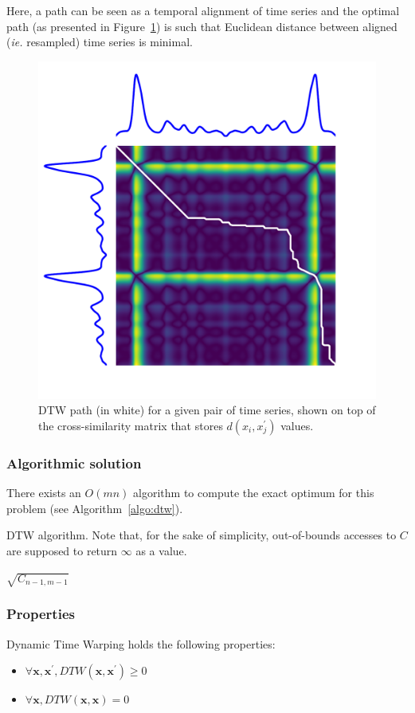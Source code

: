 Here, a path can be seen as a temporal alignment of time series and the optimal
path (as presented in Figure~\ref{fig:dtw}) is such that
Euclidean distance between aligned (\emph{ie.} resampled) time series is
minimal.

\begin{figure}[t]
\centering
\includegraphics[width=.4\textwidth]{fig/dtw}
\caption{DTW path (in white) for a given pair of time
series, shown on top of the cross-similarity matrix that stores
$d(x_i, {x}^\prime_j)$
values. \label{fig:dtw}}
\end{figure}

\subsubsection{Algorithmic solution}

There exists an $O(mn)$ algorithm to compute the exact optimum for this
problem (see Algorithm~\ref{algo:dtw}).

\begin{algorithm}[t]
 \caption{DTW algorithm. Note that, for the sake of simplicity, out-of-bounds accesses to $C$ are supposed to return $\infty$ as a value.}
 \label{algo:dtw}
  \Return $\sqrt{C_{n - 1, m - 1}}$
\end{algorithm}


\subsubsection{Properties}

Dynamic Time Warping holds the following properties:

\begin{itemize}
\item $\forall \mathbf{x}, \mathbf{x}^\prime, DTW(\mathbf{x}, \mathbf{x}^\prime) \geq 0$
\item $\forall \mathbf{x}, DTW(\mathbf{x}, \mathbf{x}) = 0$
\end{itemize}

